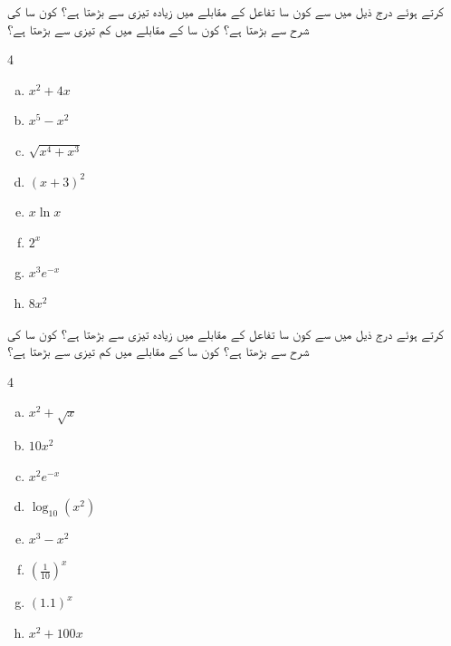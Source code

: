  کرتے ہوئے درج ذیل میں سے کون سا تفاعل  کے مقابلے میں زیادہ تیزی سے بڑھتا ہے؟ کون سا  کی شرح سے بڑھتا ہے؟  کون سا  کے مقابلے میں کم تیزی سے بڑھتا ہے؟
\begin{multicols}{4}
\begin{enumerate}[a.]
\item
$x^2+4x$
\item
$x^5-x^2$
\item
$\sqrt{x^4+x^3}$
\item
$(x+3)^2$
\item
$x\ln x$
\item
$2^x$
\item
$x^3e^{-x}$
\item
$8x^2$
\end{enumerate}
\end{multicols}
 کرتے ہوئے درج ذیل میں سے کون سا تفاعل  کے مقابلے میں زیادہ تیزی سے بڑھتا ہے؟ کون سا  کی شرح سے بڑھتا ہے؟  کون سا  کے مقابلے میں کم تیزی سے بڑھتا ہے؟
\begin{multicols}{4}
\begin{enumerate}[a.]
\item
$x^2+\sqrt{x}$
\item
$10x^2$
\item
$x^2e^{-x}$
\item
$\log_{10}(x^2)$
\item
$x^3-x^2$
\item
$(\tfrac{1}{10})^x$
\item
$(1.1)^x$
\item
$x^2+100x$
\end{enumerate}
\end{multicols}

